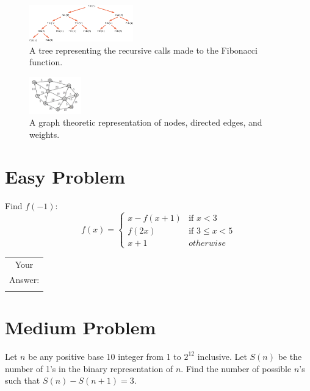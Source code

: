 \documentclass[12pt]{article}
\begin{document}
\begin{multicols}{2}
\begin{figure}[H]
  \centering
  \includegraphics[width=0.40\textwidth]{figures/fibonacci-recursion-tree.png}
  \caption{A tree representing the recursive calls made to the Fibonacci function.}
  \label{fig:recursion}
\end{figure}

\begin{figure}[H]
  \centering
  \includegraphics[width=0.20\textwidth]{figures/graph-theory.png}
  \caption{A graph theoretic representation of nodes, directed edges, and weights.}
  \label{fig:graph_theory}
\end{figure}
\end{multicols}

\section{Easy Problem}
\label{prob:easy}
Find $f(-1)$:
\begin{equation*}
f(x) =
\begin{cases}
x - f(x+1) & \text{if $x < 3$}\\
f(2x) & \text{if $3 \leq x < 5$}\\
x + 1 & otherwise
\end{cases}
\end{equation*}
\vspace{2cm}

\hfill
    \begin{tabular}[b]{|c|}
        \hline
        Your\\
        Answer:\\
        \\
        \hline
    \end{tabular}
\hfill

\section{Medium Problem}
\label{prob:medium}
Let $n$ be any positive base 10 integer from 1 to $2^{12}$ inclusive.
Let $S(n)$ be the number of 1's in the binary representation of $n$.
Find the number of possible $n$'s such that $S(n) - S(n + 1) = 3$.
\vspace{2cm}
\end{document}
